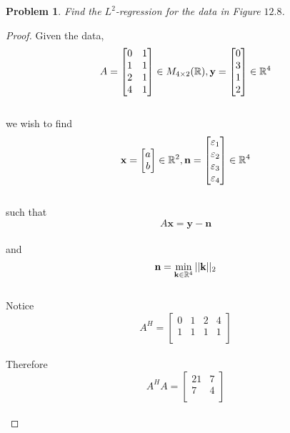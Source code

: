 \documentclass[12pt,oneside]{amsart}
\numberwithin{equation}{section}
\numberwithin{figure}{section}
\theoremstyle{plain}
\newtheorem{prob}{Problem}
\theoremstyle{definition}
\newcommand{\R}{\ensuremath \mathbb{R}}
\begin{document}
\begin{prob}
Find the $L^2$-regression for the data in Figure $12.8$. \\
\end{prob}
\begin{proof}
Given the data, \\
\[A = \begin{bmatrix}
  0 & 1 \\
  1 & 1 \\
  2 & 1 \\
  4 & 1 \\
\end{bmatrix} \in M_{4 \times 2}(\R), \mathbf{y} = \begin{bmatrix}
  0 \\
  3 \\
  1 \\
  2 \\
\end{bmatrix} \in \R^4\] \\ 
we wish to find \\
\[\mathbf{x} = \begin{bmatrix} 
  a \\
  b \\
\end{bmatrix} \in \R^2,\mathbf{n} = \begin{bmatrix}
  \varepsilon_1 \\
  \varepsilon_2 \\
  \varepsilon_3 \\
  \varepsilon_4 \\
\end{bmatrix} \in \R^4\] \\
such that \\
\[A\mathbf{x} = \mathbf{y} - \mathbf{n}\] \\
and \\
\[\mathbf{n} = \min_{\mathbf{k} \in \R^4}||\mathbf{k}||_2\] \\
Notice \\
\[A^H = \begin{bmatrix}
  0 & 1 & 2 & 4 \\
  1 & 1 & 1 & 1 \\
\end{bmatrix}\] \\
Therefore \\
\[A^HA = \begin{bmatrix}
  21 & 7 \\
  7  & 4 \\
\end{bmatrix}\] \\

\end{proof}
\end{document}
